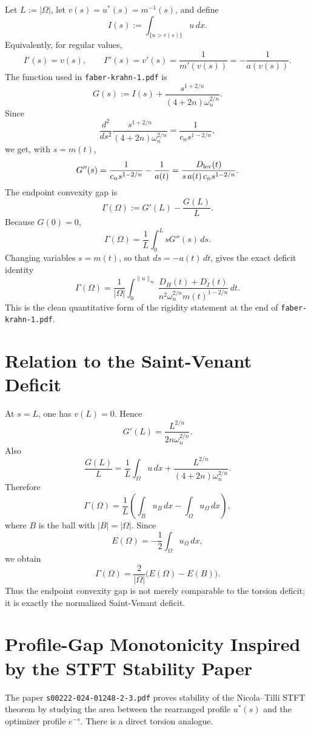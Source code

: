 \documentclass[11pt]{article}
\begin{document}
Let \(L:=|\Omega|\), let \(v(s)=u^*(s)=m^{-1}(s)\), and define
\[
I(s):=\int_{\{u>v(s)\}}u\,dx.
\]
Equivalently, for regular values,
\[
I'(s)=v(s),\qquad
I''(s)=v'(s)=\frac{1}{m'(v(s))}=-\frac{1}{a(v(s))}.
\]
The function used in \texttt{faber-krahn-1.pdf} is
\[
G(s):=
I(s)+\frac{s^{1+2/n}}{(4+2n)\omega_n^{2/n}}.
\]
Since
\[
\frac{d^2}{ds^2}
\frac{s^{1+2/n}}{(4+2n)\omega_n^{2/n}}
=
\frac{1}{c_n s^{1-2/n}},
\]
we get, with \(s=m(t)\),
\[
G''(s)
=
\frac{1}{c_n s^{1-2/n}}-\frac1{a(t)}
=
\frac{D_{\rm lev}(t)}
{s\,a(t)\,c_n s^{1-2/n}}.
\]
The endpoint convexity gap is
\[
\Gamma(\Omega):=G'(L)-\frac{G(L)}{L}.
\]
Because \(G(0)=0\),
\[
\Gamma(\Omega)=\frac1L\int_0^L sG''(s)\,ds.
\]
Changing variables \(s=m(t)\), so that \(ds=-a(t)\,dt\), gives the exact
deficit identity
\[
\boxed{
\Gamma(\Omega)
=
\frac1{|\Omega|}
\int_0^{\|u\|_\infty}
\frac{D_H(t)+D_I(t)}
{n^2\omega_n^{2/n}m(t)^{1-2/n}}\,dt.
}
\]
This is the clean quantitative form of the rigidity statement at the end of
\texttt{faber-krahn-1.pdf}.

\section{Relation to the Saint-Venant Deficit}

At \(s=L\), one has \(v(L)=0\). Hence
\[
G'(L)=\frac{L^{2/n}}{2n\omega_n^{2/n}}.
\]
Also
\[
\frac{G(L)}{L}
=
\frac1L\int_\Omega u\,dx
+
\frac{L^{2/n}}{(4+2n)\omega_n^{2/n}}.
\]
Therefore
\[
\Gamma(\Omega)
=
\frac1L\left(\int_B u_B\,dx-\int_\Omega u_\Omega\,dx\right),
\]
where \(B\) is the ball with \(|B|=|\Omega|\). Since
\[
E(\Omega)=-\frac12\int_\Omega u_\Omega\,dx,
\]
we obtain
\[
\boxed{
\Gamma(\Omega)
=
\frac{2}{|\Omega|}
\big(E(\Omega)-E(B)\big).
}
\]
Thus the endpoint convexity gap is not merely comparable to the torsion
deficit; it is exactly the normalized Saint-Venant deficit.

\section{Profile-Gap Monotonicity Inspired by the STFT Stability Paper}

The paper \texttt{s00222-024-01248-2-3.pdf} proves stability of the
Nicola--Tilli STFT theorem by studying the area between the rearranged profile
\(u^*(s)\) and the optimizer profile \(e^{-s}\). There is a direct torsion
analogue.
\end{document}
